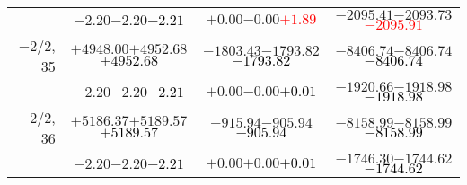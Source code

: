 \documentclass[compress]{beamer}
\begin{document}
\begin{frame}
{\begin{tabular}{r | c | c | c}
           & $-2.20$\hspace{0.1 cm}$-2.20$\hspace{0.1 cm}\textcolor{black}{$-2.21$} & $+0.00$\hspace{0.1 cm}$-0.00$\hspace{0.1 cm}\textcolor{red}{$+1.89$} & $-2095.41$\hspace{0.1 cm}$-2093.73$\hspace{0.1 cm}\textcolor{red}{$-2095.91$} \\
$-$2/2, 35 & $+4948.00$\hspace{0.1 cm}$+4952.68$\hspace{0.1 cm}\textcolor{black}{$+4952.68$} & $-1803.43$\hspace{0.1 cm}$-1793.82$\hspace{0.1 cm}\textcolor{black}{$-1793.82$} & $-8406.74$\hspace{0.1 cm}$-8406.74$\hspace{0.1 cm}\textcolor{black}{$-8406.74$} \\
           & $-2.20$\hspace{0.1 cm}$-2.20$\hspace{0.1 cm}\textcolor{black}{$-2.21$} & $+0.00$\hspace{0.1 cm}$-0.00$\hspace{0.1 cm}\textcolor{black}{$+0.01$} & $-1920.66$\hspace{0.1 cm}$-1918.98$\hspace{0.1 cm}\textcolor{black}{$-1918.98$} \\
$-$2/2, 36 & $+5186.37$\hspace{0.1 cm}$+5189.57$\hspace{0.1 cm}\textcolor{black}{$+5189.57$} & $-915.94$\hspace{0.1 cm}$-905.94$\hspace{0.1 cm}\textcolor{black}{$-905.94$} & $-8158.99$\hspace{0.1 cm}$-8158.99$\hspace{0.1 cm}\textcolor{black}{$-8158.99$} \\
           & $-2.20$\hspace{0.1 cm}$-2.20$\hspace{0.1 cm}\textcolor{black}{$-2.21$} & $+0.00$\hspace{0.1 cm}$+0.00$\hspace{0.1 cm}\textcolor{black}{$+0.01$} & $-1746.30$\hspace{0.1 cm}$-1744.62$\hspace{0.1 cm}\textcolor{black}{$-1744.62$} \\
\end{tabular}}
\end{frame}
\end{document}
